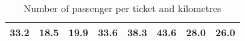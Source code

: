 \begin{table}[H]
\begin{tabular}{|l|l|l|l|l|l|l|l|}
33.2                                    & 18.5                                                                                   & 19.9                                                                                       & 33.6                                                                                   & 38.3                                                                                    & 43.6                                                                                   & 28.0                                                                                 & 26.0                                                                                \\ \hline
\end{tabular}
\caption{Number of passenger per ticket and kilometres}
\label{tab:boh}
\end{table}